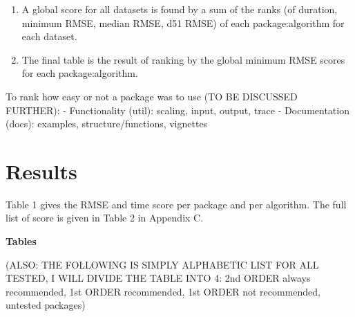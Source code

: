 \begin{enumerate}
\def\labelenumi{\arabic{enumi}.}
\setcounter{enumi}{3}
\tightlist
\item
  A global score for all datasets is found by a sum of the ranks (of
  duration, minimum RMSE, median RMSE, d51 RMSE) of each
  package:algorithm for each dataset.
\item
  The final table is the result of ranking by the global minimum RMSE
  scores for each package:algorithm.
\end{enumerate}

To rank how easy or not a package was to use (TO BE DISCUSSED FURTHER):
- Functionality (util): scaling, input, output, trace - Documentation
(docs): examples, structure/functions, vignettes

\hypertarget{results}{%
\section{Results}\label{results}}

Table 1 gives the RMSE and time score per package and per algorithm. The
full list of score is given in Table 2 in Appendix C.

\textbf{Tables}

(ALSO: THE FOLLOWING IS SIMPLY ALPHABETIC LIST FOR ALL TESTED, I WILL
DIVIDE THE TABLE INTO 4: 2nd ORDER always recommended, 1st ORDER
recommended, 1st ORDER not recommended, untested packages)

